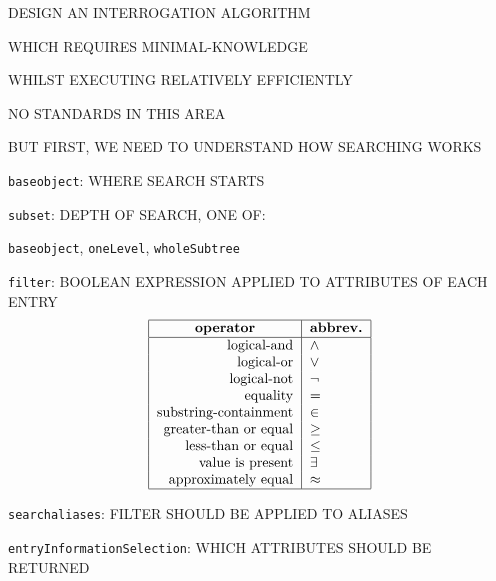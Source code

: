 \begin{bwslide}

\begin{nrtc}
\item	DESIGN AN INTERROGATION ALGORITHM
    \begin{nrtc}
    \item	WHICH REQUIRES MINIMAL-KNOWLEDGE

    \item	WHILST EXECUTING RELATIVELY EFFICIENTLY
    \end{nrtc}

\item	NO STANDARDS IN THIS AREA

\item	BUT FIRST, WE NEED TO UNDERSTAND HOW SEARCHING WORKS
\end{nrtc}
\end{bwslide}


\begin{bwslide}

\begin{nrtc}
\item \verb"baseobject": WHERE SEARCH STARTS

\item \verb"subset": DEPTH OF SEARCH, ONE OF:
    \begin{nrtc}
    \item	\verb"baseobject", \verb"oneLevel", \verb"wholeSubtree"
    \end{nrtc}

\item \verb"filter": BOOLEAN EXPRESSION APPLIED TO ATTRIBUTES OF EACH ENTRY
\[\begin{tabular}{|r|l|}
\hline
\multicolumn{1}{|c|}{\bf operator}&
			\multicolumn{1}{c|}{\bf abbrev.}\\
\hline
logical-and&		$\land$\\
logical-or&		$\lor$\\
logical-not&		$\lnot$\\
equality&		$=$\\
substring-containment&	$\in$\\
greater-than or equal&	$\geq$\\
less-than or equal&	$\leq$\\
value is present&	$\exists$\\
approximately equal&	$\approx$\\
\hline
\end{tabular}\]

\item \verb"searchaliases": FILTER SHOULD BE APPLIED TO ALIASES

\item	\verb"entryInformationSelection": WHICH ATTRIBUTES SHOULD BE RETURNED
\end{nrtc}
\end{bwslide}


